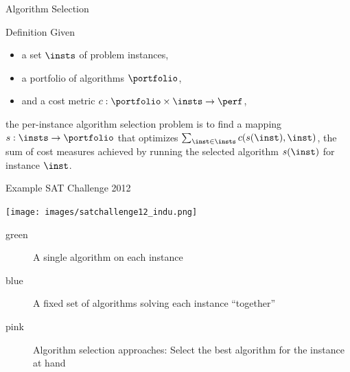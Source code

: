 \begin{frame}[c]{Algorithm Selection}

\begin{block}{Definition}
Given 
\begin{itemize}
  \item a set $\insts$ of problem instances,
  \item a portfolio of algorithms $\portfolio$, 
  \item and a cost metric $c: \portfolio \times \insts \rightarrow \perf$, 
\end{itemize}
the per-instance algorithm selection problem is to find a mapping 
$s: \insts \rightarrow \portfolio$ 
that optimizes $\sum_{\inst \in \insts} c(s(\inst), \inst)$, 
the sum of cost measures achieved by running the selected algorithm $s(\inst)$ for instance $\inst$.
\end{block}

\bigskip
\pause

\scalebox{0.8}{

}

\end{frame}
\begin{frame}[c]{Example SAT Challenge 2012}

\begin{center}
\texttt{[image: images/satchallenge12\_indu.png]}

\medskip

\begin{description}
  \item[green] A single algorithm on each instance
  \item[blue] A fixed set of algorithms solving each instance ``together''
  \item[pink] Algorithm selection approaches: Select the best algorithm for the instance at hand 
\end{description}

\end{center}


\end{frame}
